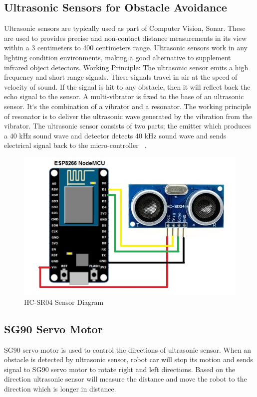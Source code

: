 \documentclass[sigconf]{acmart}
\begin{document}
\subsection{Ultrasonic Sensors for Obstacle Avoidance}
Ultrasonic sensors are typically used as part of Computer Vision, Sonar. These are used to provides precise and non-contact distance measurements in its view within a 3 centimeters to 400 centimeters range. Ultrasonic sensors work in any lighting condition environments, making a good alternative to supplement infrared object detectors.
Working Principle: The ultrasonic sensor emits a high frequency and short range signals. These signals travel in air at the speed of velocity of sound. If the signal is hit to any obstacle, then it will reflect back the echo signal to the sensor. A multi-vibrator is fixed to the base of an ultrasonic sensor. It`s the combination of a vibrator and a resonator. The working principle of resonator is to  deliver the  ultrasonic wave generated by the vibration from the vibrator. The ultrasonic sensor consists of two parts; the emitter which produces a 40 kHz sound wave and detector detects 40 kHz sound wave and sends electrical signal back to the micro-controller ~\cite{ijedr2016}.
\begin{figure}
	\includegraphics[width=1.0\columnwidth]{images/Ultrasonic-sensor.jpg}
	\caption{HC-SR04 Sensor Diagram}
\end{figure}

\subsection{SG90 Servo Motor}
SG90 servo motor is used to control the directions of ultrasonic sensor. When an obstacle is detected by ultrasonic sensor, robot car will stop its motion and sends signal to SG90 servo motor to rotate right and left directions. Based on the direction ultrasonic sensor will measure the distance and move the robot to the direction which is longer in distance.
\end{document}
